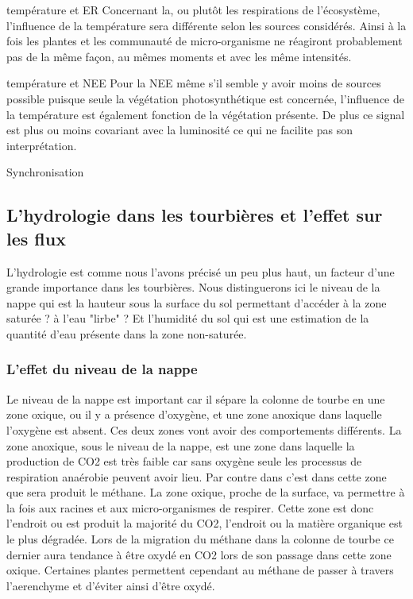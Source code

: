 température et ER
Concernant la, ou plutôt les respirations de l'écosystème, l'influence de la température sera différente selon les sources considérés.
Ainsi à la fois les plantes et les communauté de micro-organisme ne réagiront probablement pas de la même façon, au mêmes moments et avec les même intensités.

température et NEE
Pour la NEE même s'il semble y avoir moins de sources possible puisque seule la végétation photosynthétique est concernée, l'influence de la température est également fonction de la végétation présente.
De plus ce signal est plus ou moins covariant avec la luminosité ce qui ne facilite pas son interprétation.

Synchronisation


\subsection{L'hydrologie dans les tourbières et l'effet sur les flux}
L'hydrologie est comme nous l'avons précisé un peu plus haut, un facteur d'une grande importance dans les tourbières.
Nous distinguerons ici le niveau de la nappe qui est la hauteur sous la surface du sol permettant d'accéder à la zone saturée ? à l'eau "lirbe" ?
Et l'humidité du sol qui est une estimation de la quantité d'eau présente dans la zone non-saturée.

\subsubsection{L'effet du niveau de la nappe}
Le niveau de la nappe est important car il sépare la colonne de tourbe en une zone oxique, ou il y a présence d'oxygène, et une zone anoxique dans laquelle l'oxygène est absent.
Ces deux zones vont avoir des comportements différents.
La zone anoxique, sous le niveau de la nappe, est une zone dans laquelle la production de CO2 est très faible car sans oxygène seule les processus de respiration anaérobie peuvent avoir lieu.
Par contre dans c'est dans cette zone que sera produit le méthane.
La zone oxique, proche de la surface, va permettre à la fois aux racines et aux micro-organismes de respirer.
Cette zone est donc l'endroit ou est produit la majorité du CO2, l'endroit ou la matière organique est le plus dégradée.
Lors de la migration du méthane dans la colonne de tourbe ce dernier aura tendance à être oxydé en CO2 lors de son passage dans cette zone oxique.
Certaines plantes permettent cependant au méthane de passer à travers l'aerenchyme et d'éviter ainsi d'être oxydé.

